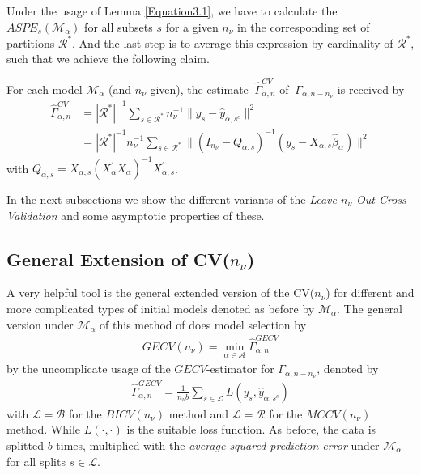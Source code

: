 \documentclass[Research_Module_ES.tex]{subfiles}
\begin{document}
Under the usage of Lemma \ref{Equation3.1}, we have to calculate the $ASPE_{s}(\mathcal{M}_\alpha)$ for all subsets $s$  for a given $n_\nu$ in the corresponding set of partitions $\mathcal{R}^\ast$. And the last step is to average this expression by cardinality of $\mathcal{R}^\ast$, such that we achieve the following claim.

\begin{claim}
	\label{estimator CV(n_v)}
	For each model $\mathcal{M}_\alpha$ (and $n_\nu$ given), the estimate $~\hat{\Gamma}_{\alpha,n}^{CV}$ of $~\Gamma_{\alpha,n-n_\nu}$ is received by
	\begin{align*}
		\hat{\Gamma}_{\alpha,n}^{CV}&=|\mathcal{R}^\ast|^{-1}\sum_{s\in \mathcal{R}^\ast}n_\nu^{-1}\parallel y_s-\hat{y}_{\alpha,s^c}\parallel^2\\
		&=|\mathcal{R}^\ast|^{-1}n_\nu^{-1}\sum_{s\in \mathcal{R}^\ast}\parallel (I_{n_\nu}-Q_{\alpha,s})^{-1}(y_s-X_{\alpha,s}\hat{\beta}_\alpha)\parallel^2
	\end{align*}	
	with $Q_{\alpha,s}=X_{\alpha,s}(X_\alpha^\prime X_\alpha)^{-1}X_{\alpha,s}^\prime$.
\end{claim}
In the next subsections we show the different variants of the \textit{Leave-$n_\nu$-Out Cross-Validation} and some asymptotic properties of these.

	







\subsection{General Extension of CV($n_\nu$)}
A very helpful tool is the general extended version of the CV($n_\nu$) for different and more complicated types of initial models denoted as before by $\mathcal{M}_\alpha$. The general version under $\mathcal{M}_\alpha$ of this method of \cite{shao} does model selection by 
\begin{align*}
	GECV(n_\nu)=\min_{\alpha\in\mathcal{A}}\hat{\Gamma}_{\alpha,n}^{GECV}
\end{align*}
by the uncomplicate usage of the $GECV$-estimator for $\Gamma_{\alpha,n-n_\nu}$, denoted by
\begin{align*}
	\hat{\Gamma}_{\alpha,n}^{GECV}=\frac{1}{n_\nu b}\sum_{s\in\mathcal{L}}L(y_s,\hat{y}_{\alpha,s^c})
\end{align*} 
with $\mathcal{L}=\mathcal{B}$ for the $BICV(n_\nu)$ method and $\mathcal{L}=\mathcal{R}$ for the $MCCV(n_\nu)$ method. While $L(\cdot,\cdot)$ is the suitable loss function. As before, the data is splitted $b$ times, multiplied with the \textit{average squared prediction error} under $\mathcal{M}_\alpha$ for all splits $s\in\mathcal{L}$.
\end{document}
